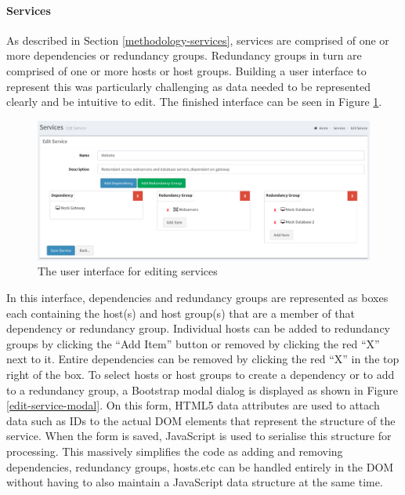 \documentclass[bsc,deptreport,twoside,parskip,singlespacing,notimes]{infthesis}
\begin{document}
\paragraph*{Services}
	As described in Section \ref{methodology-services}, services are comprised of
	one or more dependencies or redundancy groups.  Redundancy groups in turn are
	comprised of one or more hosts or host groups.  Building a user interface to
	represent this was particularly challenging as data needed to be represented
	clearly and be intuitive to edit.  The finished interface can be seen in
	Figure \ref{edit-service}.

\begin{figure}[H]
	\centering
	\caption{The user interface for editing services}
	\label{edit-service}
	\includegraphics[scale=0.44]{assets/screenshots/edit-service.pdf}
\end{figure}


	In this interface, dependencies and redundancy groups are represented as boxes
	each containing the host(s) and host group(s) that are a member of that
	dependency or redundancy group.  Individual hosts can be added to redundancy
	groups by clicking the ``Add Item'' button or removed by clicking the red ``X''
	next to it.  Entire dependencies can be removed by clicking the red ``X'' in the
	top right of the box.  To select hosts or host groups to create a dependency
	or to add to a redundancy group, a Bootstrap modal dialog is displayed as
	shown in Figure \ref{edit-service-modal}.  On this form, HTML5 data attributes
	are used to attach data such as IDs to the actual DOM elements that represent
	the structure of the service.  When the form is saved, JavaScript is used to
	serialise this structure for processing.  This massively simplifies the code
	as adding and removing dependencies, redundancy groups, hosts.etc can be
	handled entirely in the DOM without having to also maintain a JavaScript data
	structure at the same time.
\end{document}
